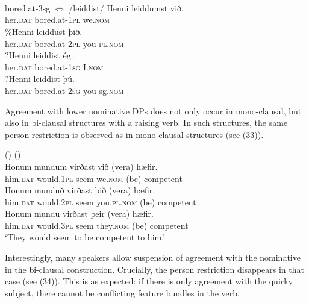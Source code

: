 \documentclass[output=paper]{langsci/langscibook}
\begin{document}
\ea 
 \gll \\
   \\
 \glt
\z

\ea \ea \citep{Sigurðsson1996}\\bored.at-3sg $\Leftrightarrow$ /leiddist/ 
\ex \gll  *Henni    leiddumst      við. \\
      her.\textsc{dat} bored.at-1\textsc{pl} we.\textsc{nom} \\
\ex\gll \%Henni   leiddust         þið. \\
       her.\textsc{dat} bored.at-2\textsc{pl} you-\textsc{pl.nom} \\
\ex\gll  ?Henni    leiddist          ég. \\
      her.\textsc{dat} bored.at-1\textsc{sg} I.\textsc{nom} \\
\ex\gll  ?Henni    leiddist          þú. \\
      her.\textsc{dat} bored.at-2\textsc{sg} you-sg.\textsc{nom}\\
\z \z

Agreement with lower nominative DPs does not only occur in mono-clausal, but also in bi-clausal structures with a raising verb. In such structures, the same person restriction is observed as in mono-clausal structures (see (33)). 

\ea (\label{bkm:Ref295483138}) 
\ea (\citealt{Sigurðsson2008})\\
\gll *Honum   mundum  virðast við        (vera) hæfir.\\
      him.\textsc{dat} would.1\textsc{pl} seem   we.\textsc{nom} (be)    competent \\
\ex 
\gll *Honum  munduð    virðast þið              (vera) hæfir.\\
      him.\textsc{dat} would.2\textsc{pl} seem    you.\textsc{pl.nom} (be)   competent\\
\ex
\gll Honum   mundu     virðast þeir         (vera) hæfir.\\
    him.\textsc{dat} would.3\textsc{pl} seem   they.\textsc{nom} (be)   competent\\
\glt  ‘They would seem to be competent to him.’
\z
\z

Interestingly, many speakers allow suspension of agreement with the nominative in the bi-clausal construction. Crucially, the person restriction disappears in that case (see (34)). This is as expected: if there is only agreement with the quirky subject, there cannot be conflicting feature bundles in the verb.
\end{document}
